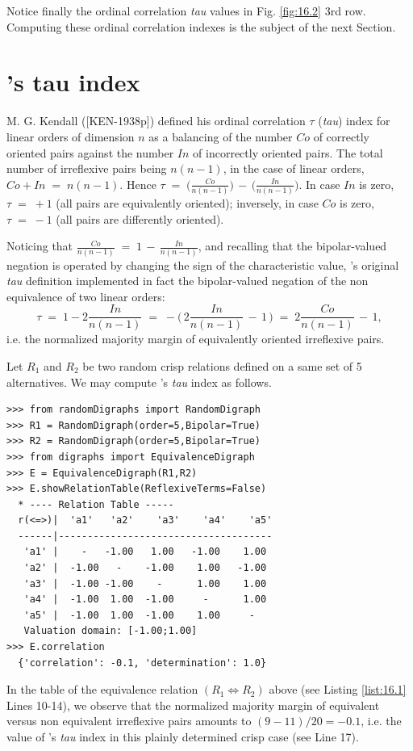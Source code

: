 Notice finally the ordinal correlation \emph{tau} values in Fig. \ref{fig:16.2} 3rd row. Computing these ordinal correlation indexes is the subject of the next Section.
 
\section{\Kendall 's tau index}
\label{sec:16:6}


M. G. Kendall ([KEN-1938p]) defined his ordinal correlation $\tau$ (\emph{tau}) index for linear orders of dimension $n$ as a balancing of the number $Co$ of correctly oriented pairs against the number $In$ of incorrectly oriented pairs. The total number of irreflexive pairs being $n(n-1)$, in the case of linear orders, $Co + In \;=\; n(n-1)$.  Hence $\tau \;=\; \big(\frac{Co}{n(n-1)}\big) \,-\, \big(\frac{In}{n(n-1)}\big)$. In case $In$ is zero, $\tau \;=\; +1$  (all pairs are equivalently oriented); inversely, in case $Co$ is zero, $\tau \;=\; -1$ (all pairs are differently oriented).

Noticing that $\frac{Co}{n(n-1)} \;=\; 1 \,-\, \frac{In}{n(n-1)}$, and recalling that the bipolar-valued negation is operated by changing the sign of the characteristic value, \Kendall 's original \emph{tau} definition implemented in fact the bipolar-valued negation of the non equivalence of two linear orders: 
\begin{equation}
      \tau \;=\; 1 -2\frac{In}{n(n-1)} \;=\; -\big(\,2\frac{In}{n(n-1)} \,-\, 1\,\big) \;=\; 2\frac{Co}{n(n-1)} \,-\, 1,
\end{equation} 
i.e. the normalized majority margin of equivalently oriented irreflexive pairs.

Let $R_1$ and $R_2$ be two random crisp relations defined on a same set of 5 alternatives. We may compute \Kendall 's \emph{tau} index as follows.

\begin{lstlisting}[caption={Computing a relational equivalence digraph},label=list:16.1]
>>> from randomDigraphs import RandomDigraph
>>> R1 = RandomDigraph(order=5,Bipolar=True)
>>> R2 = RandomDigraph(order=5,Bipolar=True)
>>> from digraphs import EquivalenceDigraph
>>> E = EquivalenceDigraph(R1,R2)
>>> E.showRelationTable(ReflexiveTerms=False)
  * ---- Relation Table -----
  r(<=>)|  'a1'	  'a2'	  'a3'	  'a4'	  'a5'	  
  ------|-------------------------------------
   'a1' |    -   -1.00   1.00   -1.00    1.00	 
   'a2' |  -1.00   -    -1.00    1.00   -1.00	 
   'a3' |  -1.00 -1.00    -      1.00    1.00	 
   'a4' |  -1.00  1.00  -1.00     -      1.00	 
   'a5' |  -1.00  1.00  -1.00    1.00     - 	 
   Valuation domain: [-1.00;1.00]
>>> E.correlation
  {'correlation': -0.1, 'determination': 1.0}
\end{lstlisting}
In the table of the equivalence relation $(R_1 \Leftrightarrow R_2)$ above (see Listing \ref{list:16.1} Lines 10-14), we observe that the normalized majority margin of equivalent versus non equivalent irreflexive pairs amounts to $(9 - 11)/20 = -0.1$, i.e. the value of \Kendall 's \emph{tau} index in this plainly determined crisp case (see Line 17).

